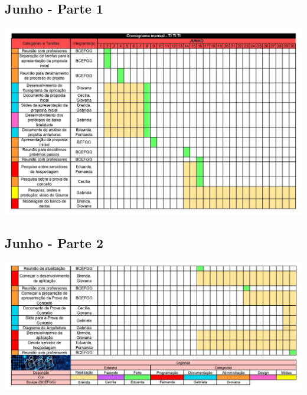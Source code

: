 \begin{apendicesenv}
\begin{flushleft}
    \section{Junho - Parte 1}
\end{flushleft}
\centering
\includegraphics[scale=0.75,angle=90,pagecommand=\chapter{Cronograma Mensal - Junho - Parte 1}\label{cronograma-junho1}]{imagens/CronogramaJUNHO_01.jpg}

\begin{flushleft}
    \section{Junho - Parte 2}
\end{flushleft}
\centering
\includegraphics[scale=0.75,angle=90,pagecommand=\chapter{Cronograma Mensal - Junho - Parte 2}\label{cronograma-junho2}]{imagens/CronogramaJUNHO_02.jpg}


\end{apendicesenv}
